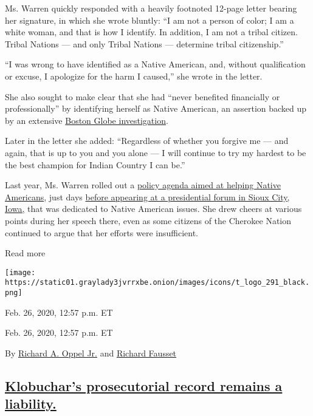 Ms. Warren quickly responded with a heavily footnoted 12-page letter
bearing her signature, in which she wrote bluntly: ``I am not a person
of color; I am a white woman, and that is how I identify. In addition, I
am not a tribal citizen. Tribal Nations --- and only Tribal Nations ---
determine tribal citizenship.''

``I was wrong to have identified as a Native American, and, without
qualification or excuse, I apologize for the harm I caused,'' she wrote
in the letter.

She also sought to make clear that she had ``never benefited financially
or professionally'' by identifying herself as Native American, an
assertion backed up by an extensive
\href{https://www.bostonglobe.com/news/nation/2018/09/01/did-claiming-native-american-heritage-actually-help-elizabeth-warren-get-ahead-but-complicated/wUZZcrKKEOUv5Spnb7IO0K/story.html}{Boston
Globe investigation}.

Later in the letter she added: ``Regardless of whether you forgive me
--- and again, that is up to you and you alone --- I will continue to
try my hardest to be the best champion for Indian Country I can be.''

Last year, Ms. Warren rolled out a
\href{https://www.nytimes3xbfgragh.onion/2019/08/16/us/politics/elizabeth-warren-native-american.html}{policy
agenda aimed at helping Native Americans}, just days
\href{https://www.nytimes3xbfgragh.onion/2019/08/19/us/politics/elizabeth-warren-native-american.html}{before
appearing at a presidential forum in Sioux City, Iowa,} that was
dedicated to Native American issues. She drew cheers at various points
during her speech there, even as some citizens of the Cherokee Nation
continued to argue that her efforts were insufficient.

Read more

\texttt{[image: https://static01.graylady3jvrrxbe.onion/images/icons/t\_logo\_291\_black.png]}

Feb. 26, 2020, 12:57 p.m. ET

Feb. 26, 2020, 12:57 p.m. ET

By
\href{https://www.nytimes3xbfgragh.onion/by/richard-a-oppel-jr}{Richard
A. Oppel Jr.} and
\href{https://www.nytimes3xbfgragh.onion/by/richard-fausset}{Richard
Fausset}

\hypertarget{klobuchars-prosecutorial-record-remains-a-liability}{%
\subsection{\texorpdfstring{\protect\hyperlink{klobuchars-prosecutorial-record-remains-a-liability}{Klobuchar's
prosecutorial record remains a
liability.}}{Klobuchar's prosecutorial record remains a liability.}}\label{klobuchars-prosecutorial-record-remains-a-liability}}

